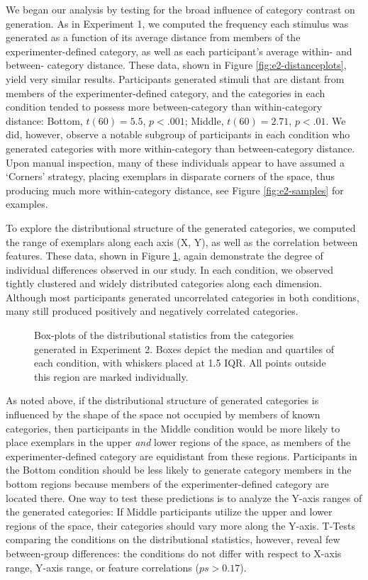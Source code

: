 \documentclass[12pt]{article}
\newcommand\inputpgf[2]{{
\let\pgfimageWithoutPath\pgfimage
\renewcommand{\pgfimage}[2][]{\pgfimageWithoutPath[##1]{#1/##2}}

}}
\begin{document}
\begin{flushleft}
We began our analysis by testing for the broad influence of category contrast on
generation. As in Experiment 1, we computed the frequency each stimulus was
generated as a function of its average distance from members of the
experimenter-defined category, as well as each participant's average within- and
between- category distance. These data, shown in Figure
\ref{fig:e2-distanceplots}, yield very similar results. Participants generated
stimuli that are distant from members of the experimenter-defined category, and
the categories in each condition tended to possess more between-category than
within-category distance: Bottom, $t(60) = 5.5$, $p < .001$; Middle, $t(60) =
2.71$, $p < .01$. We did, however, observe a notable subgroup of participants
in each condition who generated categories with more within-category than
between-category distance. Upon manual inspection, many of these individuals
appear to have assumed a `Corners' strategy, placing exemplars in disparate
corners of the space, thus producing much more within-category distance, see
Figure \ref{fig:e2-samples} for examples.

To explore the distributional structure of the generated categories, we computed
the range of exemplars along each axis (X, Y), as well as the correlation
between features. These data, shown in Figure \ref{fig:e2-statsboxes}, again
demonstrate the degree of individual differences observed in our study. In each
condition, we observed tightly clustered and widely distributed categories along
each dimension. Although most participants generated uncorrelated categories in
both conditions, many still produced positively and negatively correlated
categories.

\begin{figure}
    \begin{center} \inputpgf{figs/}{e2-statsboxes.pgf}
    \caption{Box-plots of the distributional statistics from the categories
generated in Experiment 2. Boxes depict the median and quartiles of each
condition, with whiskers placed at 1.5 IQR. All points outside this region are
marked individually.}
    \label{fig:e2-statsboxes}
    \end{center}
\end{figure}


As noted above, if the distributional structure of generated categories is
influenced by the shape of the space not occupied by members of known
categories, then participants in the Middle condition would be more likely to
place exemplars in the upper {\em and} lower regions of the space, as members of
the experimenter-defined category are equidistant from these regions.
Participants in the Bottom condition should be less likely to generate category
members in the bottom regions because members of the experimenter-defined
category are located there. One way to test these predictions is to analyze the
Y-axis ranges of the generated categories: If Middle participants utilize the
upper and lower regions of the space, their categories should vary more along
the Y-axis. T-Tests comparing the conditions on the distributional statistics,
however, reveal few between-group differences: the conditions do not differ with
respect to X-axis range, Y-axis range, or feature correlations ($ps>0.17$).


\end{flushleft}
\end{document}
